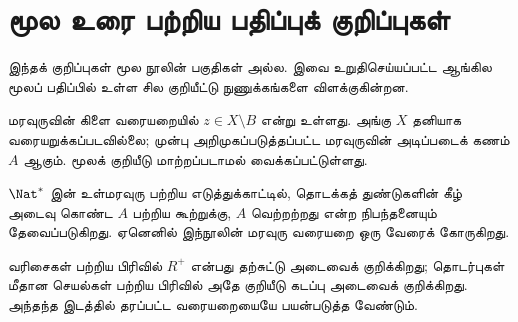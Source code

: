 \section*{மூல உரை பற்றிய பதிப்புக் குறிப்புகள்}
இந்தக் குறிப்புகள் மூல நூலின் பகுதிகள் அல்ல. இவை உறுதிசெய்யப்பட்ட
ஆங்கில மூலப் பதிப்பில் உள்ள சில குறியீட்டு நுணுக்கங்களை விளக்குகின்றன.

மரவுருவின் கிளை வரையறையில் $z\in X\setminus B$ என்று உள்ளது.
அங்கு $X$ தனியாக வரையறுக்கப்படவில்லை; முன்பு அறிமுகப்படுத்தப்பட்ட
மரவுருவின் அடிப்படைக் கணம் $A$ ஆகும். மூலக் குறியீடு மாற்றப்படாமல்
வைக்கப்பட்டுள்ளது.

$\Nat^*$ இன் உள்மரவுரு பற்றிய எடுத்துக்காட்டில், தொடக்கத் துண்டுகளின் கீழ்
அடைவு கொண்ட $A$ பற்றிய கூற்றுக்கு, $A$ வெற்றற்றது என்ற நிபந்தனையும்
தேவைப்படுகிறது. ஏனெனில் இந்நூலின் மரவுரு வரையறை ஒரு வேரைக் கோருகிறது.

வரிசைகள் பற்றிய பிரிவில் $R^+$ என்பது தற்சுட்டு அடைவைக் குறிக்கிறது;
தொடர்புகள் மீதான செயல்கள் பற்றிய பிரிவில் அதே குறியீடு கடப்பு அடைவைக்
குறிக்கிறது. அந்தந்த இடத்தில் தரப்பட்ட வரையறையையே பயன்படுத்த வேண்டும்.
